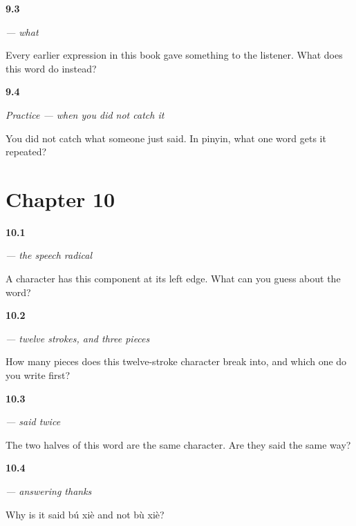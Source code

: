 \noindent\begin{minipage}[t]{\linewidth}
\raggedright
\hypertarget{review-ZH-C09-shenme-job}{\textbf{9.3}} \emph{ — what}\par
\small Every earlier expression in this book gave something to the listener. What does this word do instead?
\end{minipage}\par\medskip

\noindent\begin{minipage}[t]{\linewidth}
\raggedright
\hypertarget{review-ZH-C09-practice-repair}{\textbf{9.4}} \emph{Practice — when you did not catch it}\par
\small You did not catch what someone just said. In pinyin, what one word gets it repeated?
\end{minipage}\par\medskip

\section*{Chapter 10}

\noindent\begin{minipage}[t]{\linewidth}
\raggedright
\hypertarget{review-ZH-W10-yan-meaning}{\textbf{10.1}} \emph{ — the speech radical}\par
\small A character has this component at its left edge. What can you guess about the word?
\end{minipage}\par\medskip

\noindent\begin{minipage}[t]{\linewidth}
\raggedright
\hypertarget{review-ZH-W10-xie-pieces}{\textbf{10.2}} \emph{ — twelve strokes, and three pieces}\par
\small How many pieces does this twelve-stroke character break into, and which one do you write first?
\end{minipage}\par\medskip

\noindent\begin{minipage}[t]{\linewidth}
\raggedright
\hypertarget{review-ZH-C10-xiexie-same}{\textbf{10.3}} \emph{ — said twice}\par
\small The two halves of this word are the same character. Are they said the same way?
\end{minipage}\par\medskip

\noindent\begin{minipage}[t]{\linewidth}
\raggedright
\hypertarget{review-ZH-C10-buxie-tone}{\textbf{10.4}} \emph{ — answering thanks}\par
\small Why is it said bú xiè and not bù xiè?
\end{minipage}\par\medskip

